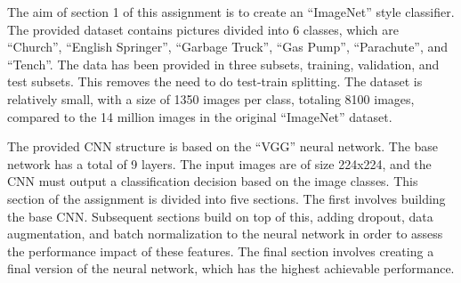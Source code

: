 The aim of section 1 of this assignment is to create an ``ImageNet'' style
classifier. The provided dataset contains pictures divided into 6 classes,
which are ``Church'', ``English Springer'', ``Garbage Truck'', ``Gas Pump'',
``Parachute'', and ``Tench''. The data has been provided in three subsets,
training, validation, and test subsets. This removes the need to do test-train
splitting. The dataset is relatively small, with a size of 1350 images
per class, totaling 8100 images,
compared to the 14 million images in the original ``ImageNet'' dataset.

The provided CNN structure is based on the ``VGG'' neural network. The base
network has a total of 9 layers. The input images are of size 224x224, and the
CNN must output a classification decision based on the image classes. This
section of the assignment is divided into five sections. The first involves
building the base CNN. Subsequent sections build on top of this, adding dropout,
data augmentation, and batch normalization to the neural network in order to
assess the performance impact of these features. The final section involves
creating a final version of the neural network, which has the highest achievable
performance.
